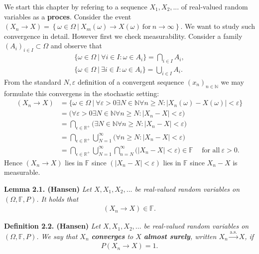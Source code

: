 \documentclass[a4paper,10pt,openany]{book}
\begin{document}
We start this chapter by refering to a sequence \(X_1,X_2,...\) of real-valued random variables as a \textbf{proces}. Consider the event \((X_n\to X)=\left\{\omega\in\Omega\ \vert\ X_m(\omega)\to X(\omega)\ \text{for}\ n\to \infty\right\}\). We want to study such convergence in detail. However first we check measurability. Consider a family \((A_i)_{i\in I}\subset \Omega\) and observe that
\begin{align*}
    \Big\{\omega\in \Omega\ \vert\ \forall i\in I : \omega \in A_i\Big\}=\bigcap_{i\in I} A_i,\tag{2.1}\\
    \Big\{\omega\in \Omega\ \vert\ \exists i\in I : \omega \in A_i\Big\}=\bigcup_{i\in I} A_i.\tag{2.2}
\end{align*}
From the standard \(N,\varepsilon\) definition of a convergent sequence \((x_n)_{n\in \mathbb{N}}\) we may formulate this convergens in the stochastic setting:
\begin{align*}
    (X_n\to X)&=\Big\{\omega\in \Omega\ \vert\ \forall\varepsilon>0 \exists N\in \mathbb{N} \forall n\ge N : \vert X_n(\omega)-X(\omega)\vert <\varepsilon\Big\}\\
    &=\Big(\forall\varepsilon>0 \exists N\in \mathbb{N} \forall n\ge N : \vert X_n-X\vert <\varepsilon\Big)\\
    &=\bigcap_{\epsilon\in \mathbb{R}^+}\Big(\exists N\in \mathbb{N} \forall n\ge N : \vert X_n-X\vert<\varepsilon\Big)\\
    &=\bigcap_{\epsilon\in \mathbb{R}^+}\bigcup_{N=1}^\infty\Big( \forall n\ge N : \vert X_n-X\vert<\varepsilon\Big)\\
    &=\bigcap_{\epsilon\in \mathbb{R}^+}\bigcup_{N=1}^\infty\bigcap_{n=N}^\infty\Big(  \vert X_n-X\vert<\varepsilon\Big)\in \mathbb{F}\hspace{15pt}\text{for all}\ \varepsilon>0.
\end{align*}
Hence \((X_n\to X)\) lies in \(\mathbb{F}\) since \((\vert X_n-X\vert <\varepsilon)\) lies in \(\mathbb{F}\) since \(X_n-X\) is measurable.

\textbf{Lemma 2.1. (Hansen)} \emph{Let \(X,X_1,X_2,...\) be real-valued random variables on \((\Omega, \mathbb{F},P)\). It holds that}
\begin{align*}
    (X_n\to X)\in \mathbb{F}.
\end{align*}

\textbf{Definition 2.2. (Hansen)} \emph{Let \(X,X_1,X_2,...\) be real-valued random variables on \((\Omega,\mathbb{F},P)\). We say that \(X_n\) \textbf{converges} to \(X\) \textbf{almost surely}, written \(X_n\stackrel{\text{a.s.}}{\to}X\), if}
\begin{align*}
    P(X_n\to X)=1.\tag{2.6}
\end{align*}
\end{document}
